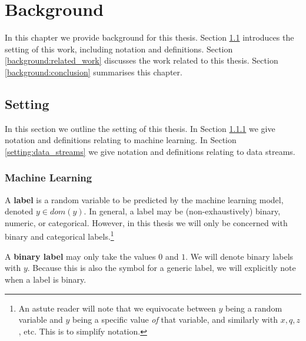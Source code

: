 \chapter{Background} \label{chapt:Background}

In this chapter we provide background for this thesis. Section \ref{background:setting} introduces the setting of this work, including notation and definitions. Section \ref{background:related_work} discusses the work related to this thesis. Section \ref{background:conclusion} summarises this chapter.


\section{Setting} \label{background:setting}

In this section we outline the setting of this thesis. In Section \ref{setting:ml} we give notation and definitions relating to machine learning.  In Section \ref{setting:data_streams} we give notation and definitions relating to data streams.  

\subsection{Machine Learning} \label{setting:ml}

\newcommand{\y}[1]{y^{(#1)}}
\newcommand{\yhat}[1]{\hat{y}^{(#1)}}
\newcommand{\q}[1]{q^{(#1)}}
\newcommand{\qhat}[1]{\hat{q}^{(#1)}}
\newcommand{\id}[1]{\mathds{1}[#1]} %
\newcommand{\x}[1]{x^{(#1)}}
\newcommand{\X}[1]{X^{(#1)}}
\newcommand{\qyhat}{\q{\hat{y}}}
\newcommand{\qhatyhat}{\qhat{\hat{y}}}

A {\bf label} is a random variable to be predicted by the machine learning model, denoted $y\in dom(y)$. In general, a label may be (non-exhaustively) binary, numeric, or categorical. However, in this thesis we will only be concerned with binary and categorical labels.\footnote{An astute reader will note that we equivocate between $y$ being a random variable and $y$ being a specific value {\it of} that variable, and similarly with $x,q,z$, etc. This is to simplify notation.}  

A {\bf binary label} may only take the values $0$ and $1$. We will denote binary labels with $y$. Because this is also the symbol for a generic label, we will explicitly note when a label is binary. 

